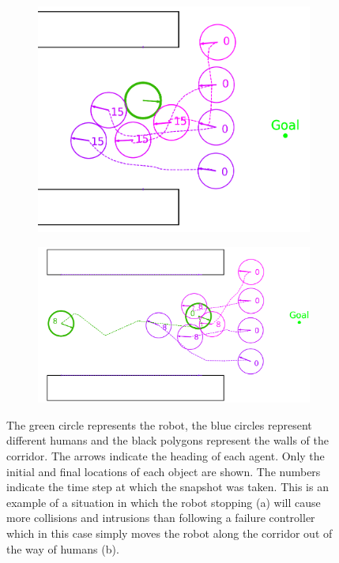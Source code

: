 \documentclass[letterpaper, 10 pt, conference]{ieeeconf}  %
\begin{document}
	\begin{figure}
		\centering
		\begin{subfigure}[t]{0.49\linewidth}
			\includegraphics[width=\linewidth]{dnmotive}
			\caption{}
			\label{fig:dnmotivation}
		\end{subfigure}
		\begin{subfigure}[t]{0.49\linewidth}
			\includegraphics[width=\linewidth]{rlmotive}
			\caption{}
		\end{subfigure}
		\caption{The green circle represents the robot, the blue circles represent different humans and the black polygons represent the walls of the corridor. The arrows indicate the heading of each agent. Only the initial and final locations of each object are shown. The numbers indicate the time step at which the snapshot was taken. This is an example of a situation in which the robot stopping (a) will cause more collisions and intrusions than following a failure controller which in this case simply moves the robot along the corridor out of the way of humans (b).}
		\label{fig:motivation}
	\end{figure}
	
\end{document}
